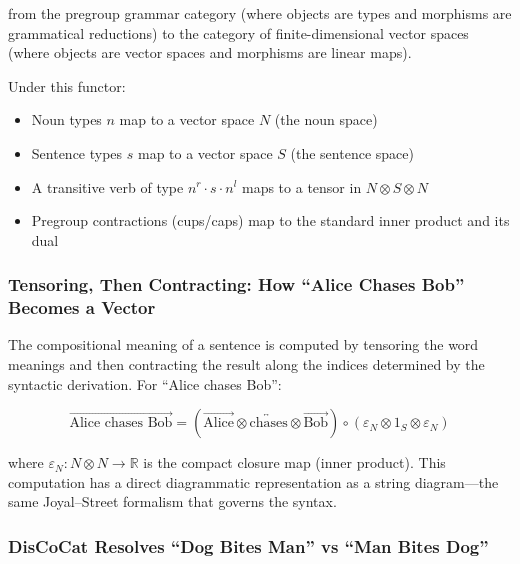 \documentclass[
]{article}
\providecommand{\tightlist}{%
  \setlength{\itemsep}{0pt}\setlength{\parskip}{0pt}}
\begin{document}
from the pregroup grammar category (where objects are types and
morphisms are grammatical reductions) to the category of
finite-dimensional vector spaces (where objects are vector spaces and
morphisms are linear maps).

Under this functor:

\begin{itemize}
\tightlist
\item
  Noun types \(n\) map to a vector space \(N\) (the noun space)
\item
  Sentence types \(s\) map to a vector space \(S\) (the sentence space)
\item
  A transitive verb of type \(n^r \cdot s \cdot n^l\) maps to a tensor
  in \(N \otimes S \otimes N\)
\item
  Pregroup contractions (cups/caps) map to the standard inner product
  and its dual
\end{itemize}

\subsubsection{Tensoring, Then Contracting: How ``Alice Chases Bob''
Becomes a
Vector}\label{tensoring-then-contracting-how-alice-chases-bob-becomes-a-vector}

The compositional meaning of a sentence is computed by tensoring the
word meanings and then contracting the result along the indices
determined by the syntactic derivation. For ``Alice chases Bob'':

\begin{equation}
\overrightarrow{\text{Alice chases Bob}} = (\overrightarrow{\text{Alice}} \otimes \overleftrightarrow{\text{chases}} \otimes \overrightarrow{\text{Bob}}) \circ (\varepsilon_N \otimes 1_S \otimes \varepsilon_N)
\label{eq:eq-4-2}
\end{equation}

where \(\varepsilon_N: N \otimes N \to \mathbb{R}\) is the compact
closure map (inner product). This computation has a direct diagrammatic
representation as a string diagram---the same Joyal--Street
\citep{joyalstreet1991geometry} formalism that governs the syntax.

\subsubsection{DisCoCat Resolves ``Dog Bites Man'' vs ``Man Bites
Dog''}\label{discocat-resolves-dog-bites-man-vs-man-bites-dog}
\end{document}
